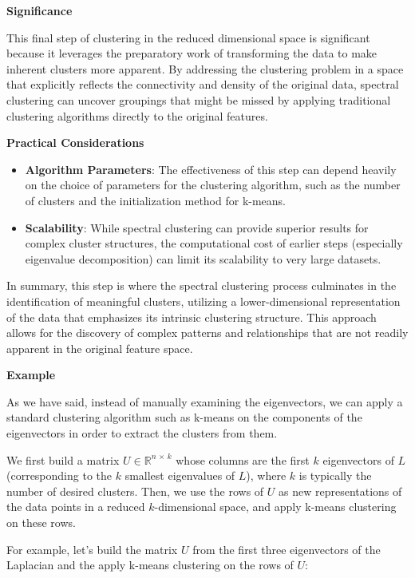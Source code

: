 \documentclass[11pt]{article}
\begin{document}
    \textbf{Significance}

This final step of clustering in the reduced dimensional space is
significant because it leverages the preparatory work of transforming
the data to make inherent clusters more apparent. By addressing the
clustering problem in a space that explicitly reflects the connectivity
and density of the original data, spectral clustering can uncover
groupings that might be missed by applying traditional clustering
algorithms directly to the original features.

    \textbf{Practical Considerations}

\begin{itemize}
\item
  \textbf{Algorithm Parameters}: The effectiveness of this step can
  depend heavily on the choice of parameters for the clustering
  algorithm, such as the number of clusters and the initialization
  method for k-means.
\item
  \textbf{Scalability}: While spectral clustering can provide superior
  results for complex cluster structures, the computational cost of
  earlier steps (especially eigenvalue decomposition) can limit its
  scalability to very large datasets.
\end{itemize}

    In summary, this step is where the spectral clustering process
culminates in the identification of meaningful clusters, utilizing a
lower-dimensional representation of the data that emphasizes its
intrinsic clustering structure. This approach allows for the discovery
of complex patterns and relationships that are not readily apparent in
the original feature space.

    \textbf{Example}

As we have said, instead of manually examining the eigenvectors, we can
apply a standard clustering algorithm such as k-means on the components
of the eigenvectors in order to extract the clusters from them.

We first build a matrix \(U \in \mathbb{R}^{n \, \times \, k}\) whose
columns are the first \(k\) eigenvectors of \(L\) (corresponding to the
\(k\) smallest eigenvalues of \(L\)), where \(k\) is typically the
number of desired clusters. Then, we use the rows of \(U\) as new
representations of the data points in a reduced \(k\)-dimensional space,
and apply k-means clustering on these rows.

For example, let's build the matrix \(U\) from the first three
eigenvectors of the Laplacian and the apply k-means clustering on the
rows of \(U\):
\end{document}
